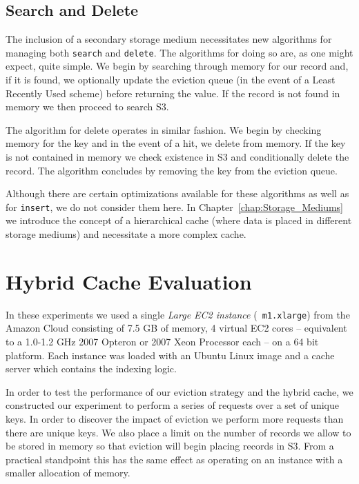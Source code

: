 
\subsection{Search and Delete} %
\label{sub:hybrid_search_delete}
The inclusion of a secondary storage medium necessitates new algorithms for
managing both {\tt search} and {\tt delete}. The algorithms for doing so are,
as one might expect, quite simple. We begin by searching through memory for our
record and, if it is found, we optionally update the eviction queue (\eg in the
event of a Least Recently Used scheme) before returning the value. If the
record is not found in memory we then proceed to search S3.

The algorithm for delete operates in similar fashion. We begin by checking
memory for the key and in the event of a hit, we delete from memory. If the key
is not contained in memory we check existence in S3 and conditionally delete
the record. The algorithm concludes by removing the key from the eviction
queue.

Although there are certain optimizations available for these algorithms as well
as for {\tt insert}, we do not consider them here. In
Chapter~\ref{chap:Storage_Mediums} we introduce the concept of a hierarchical
cache (where data is placed in different storage mediums) and necessitate a
more complex cache.



\section{Hybrid Cache Evaluation} %
\label{sub:hybrid_system_evaluation}
In these experiments we used a single \emph{Large EC2 instance} ({\tt
m1.xlarge}) from the Amazon Cloud consisting of 7.5 GB of memory, 4 virtual EC2
cores -- equivalent to a 1.0-1.2 GHz 2007 Opteron or 2007 Xeon Processor each
-- on a 64 bit platform.  Each instance was loaded with an Ubuntu Linux image
and a cache server which contains the indexing logic.

In order to test the performance of our eviction strategy and the hybrid cache,
we constructed our experiment to perform a series of requests over a set of
unique keys. In order to discover the impact of eviction we perform more
requests than there are unique keys. We also place a limit on the number of
records we allow to be stored in memory so that eviction will begin placing
records in S3. From a practical standpoint this has the same effect as
operating on an instance with a smaller allocation of memory.

